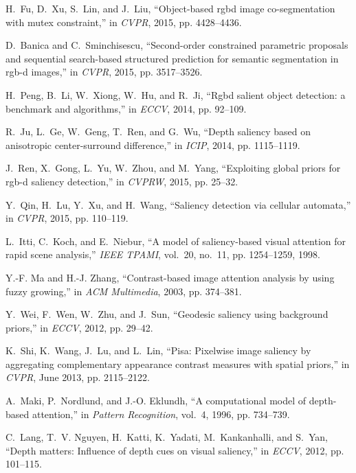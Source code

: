 \documentclass[journal]{IEEEtran}
\begin{document}
\begin{thebibliography}{10}
H.~Fu, D.~Xu, S.~Lin, and J.~Liu, ``Object-based rgbd image co-segmentation
  with mutex constraint,'' in \emph{CVPR}, 2015, pp. 4428--4436.

D.~Banica and C.~Sminchisescu, ``Second-order constrained parametric proposals
  and sequential search-based structured prediction for semantic segmentation
  in rgb-d images,'' in \emph{CVPR}, 2015, pp. 3517--3526.

H.~Peng, B.~Li, W.~Xiong, W.~Hu, and R.~Ji, ``Rgbd salient object detection: a
  benchmark and algorithms,'' in \emph{ECCV}, 2014, pp. 92--109.

R.~Ju, L.~Ge, W.~Geng, T.~Ren, and G.~Wu, ``Depth saliency based on anisotropic
  center-surround difference,'' in \emph{ICIP}, 2014, pp. 1115--1119.

J.~Ren, X.~Gong, L.~Yu, W.~Zhou, and M.~Yang, ``Exploiting global priors for
  rgb-d saliency detection,'' in \emph{CVPRW}, 2015, pp. 25--32.

Y.~Qin, H.~Lu, Y.~Xu, and H.~Wang, ``Saliency detection via cellular
  automata,'' in \emph{CVPR}, 2015, pp. 110--119.

L.~Itti, C.~Koch, and E.~Niebur, ``A model of saliency-based visual attention
  for rapid scene analysis,'' \emph{IEEE TPAMI}, vol.~20, no.~11, pp.
  1254--1259, 1998.

Y.-F. Ma and H.-J. Zhang, ``Contrast-based image attention analysis by using
  fuzzy growing,'' in \emph{ACM Multimedia}, 2003, pp. 374--381.

Y.~Wei, F.~Wen, W.~Zhu, and J.~Sun, ``Geodesic saliency using background
  priors,'' in \emph{ECCV}, 2012, pp. 29--42.

K.~Shi, K.~Wang, J.~Lu, and L.~Lin, ``Pisa: Pixelwise image saliency by
  aggregating complementary appearance contrast measures with spatial priors,''
  in \emph{CVPR}, June 2013, pp. 2115--2122.

A.~Maki, P.~Nordlund, and J.-O. Eklundh, ``A computational model of depth-based
  attention,'' in \emph{Pattern Recognition}, vol.~4, 1996, pp. 734--739.

C.~Lang, T.~V. Nguyen, H.~Katti, K.~Yadati, M.~Kankanhalli, and S.~Yan, ``Depth
  matters: Influence of depth cues on visual saliency,'' in \emph{ECCV}, 2012,
  pp. 101--115.


\end{thebibliography}
\end{document}
